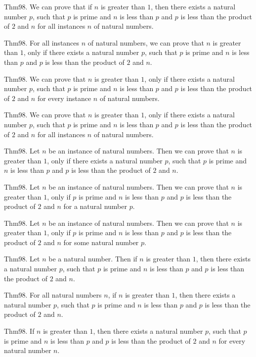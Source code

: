 \documentclass{article}
\begin{document}
Thm98. We can prove that if $n$ is greater than $1$, then there exists a natural number $p$, such that $p$ is prime and $n$ is less than $p$ and $p$ is less than the product of $2$ and $n$ for all instances $n$ of natural numbers.

Thm98. For all instances $n$ of natural numbers, we can prove that $n$ is greater than $1$, only if there exists a natural number $p$, such that $p$ is prime and $n$ is less than $p$ and $p$ is less than the product of $2$ and $n$.

Thm98. We can prove that $n$ is greater than $1$, only if there exists a natural number $p$, such that $p$ is prime and $n$ is less than $p$ and $p$ is less than the product of $2$ and $n$ for every instance $n$ of natural numbers.

Thm98. We can prove that $n$ is greater than $1$, only if there exists a natural number $p$, such that $p$ is prime and $n$ is less than $p$ and $p$ is less than the product of $2$ and $n$ for all instances $n$ of natural numbers.

Thm98. Let $n$ be an instance of natural numbers. Then we can prove that $n$ is greater than $1$, only if there exists a natural number $p$, such that $p$ is prime and $n$ is less than $p$ and $p$ is less than the product of $2$ and $n$.

Thm98. Let $n$ be an instance of natural numbers. Then we can prove that $n$ is greater than $1$, only if $p$ is prime and $n$ is less than $p$ and $p$ is less than the product of $2$ and $n$ for a natural number $p$.

Thm98. Let $n$ be an instance of natural numbers. Then we can prove that $n$ is greater than $1$, only if $p$ is prime and $n$ is less than $p$ and $p$ is less than the product of $2$ and $n$ for some natural number $p$.

Thm98. Let $n$ be a natural number. Then if $n$ is greater than $1$, then there exists a natural number $p$, such that $p$ is prime and $n$ is less than $p$ and $p$ is less than the product of $2$ and $n$.

Thm98. For all natural numbers $n$, if $n$ is greater than $1$, then there exists a natural number $p$, such that $p$ is prime and $n$ is less than $p$ and $p$ is less than the product of $2$ and $n$.

Thm98. If $n$ is greater than $1$, then there exists a natural number $p$, such that $p$ is prime and $n$ is less than $p$ and $p$ is less than the product of $2$ and $n$ for every natural number $n$.
\end{document}
